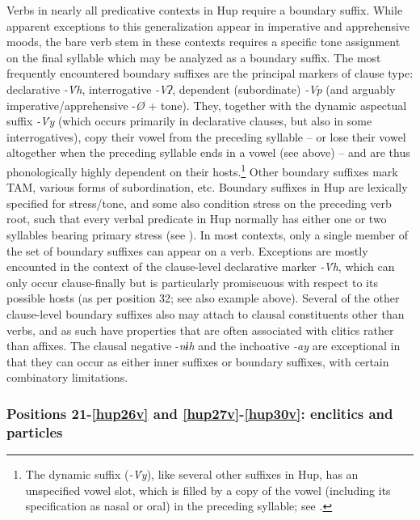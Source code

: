 \documentclass[output=paper]{langscibook}
\begin{document}
Verbs in nearly all predicative contexts in Hup require a boundary suffix. While apparent exceptions to this generalization appear in imperative and apprehensive moods, the bare verb stem in these contexts requires a specific tone assignment on the final syllable which may be analyzed as a boundary suffix. The most frequently encountered boundary suffixes are the principal markers of clause type: declarative \textit{{}-\'{V}h}, interrogative \textit{{}-Vʔ}, dependent (subordinate) \textit{{}-Vp} (and arguably imperative/apprehensive -\textit{Ø} + tone). They, together with the dynamic aspectual suffix \textit{{}-\'{V}y} (which occurs primarily in declarative clauses, but also in some interrogatives), copy their vowel from the preceding syllable – or lose their vowel altogether when the preceding syllable ends in a vowel (see  above) – and are thus phonologically highly dependent on their hosts.\footnote{The dynamic suffix (\textit{{}-\'{V}y}), like several other suffixes in Hup, has an unspecified vowel slot, which is filled by a copy of the vowel (including its specification as nasal or oral) in the preceding syllable; see .} Other boundary suffixes mark TAM, various forms of subordination, etc. Boundary suffixes in Hup are lexically specified for stress/tone, and some also condition stress on the preceding verb root, such that every verbal predicate in Hup normally has either one or two syllables bearing primary stress (see ). In most contexts, only a single member of the set of boundary suffixes can appear on a verb. Exceptions are mostly encounted in the context of the clause-level declarative marker \textit{{}-\'{V}h}, which can only occur clause-finally but is particularly promiscuous with respect to its possible hosts (as per position 32; see also example  above). Several of the other clause-level boundary suffixes also may attach to clausal constituents other than verbs, and as such have properties that are often associated with clitics rather than affixes. The clausal negative -\textit{nɨh} and the inchoative \textit{{}-ay} are exceptional in that they can occur as either inner suffixes or boundary suffixes, with certain combinatory limitations.


\subsubsection{Positions 21-\ref{hup26v} and \ref{hup27v}-\ref{hup30v}: enclitics and particles} \label{sec:hup:key:3.1.5}%
\end{document}
